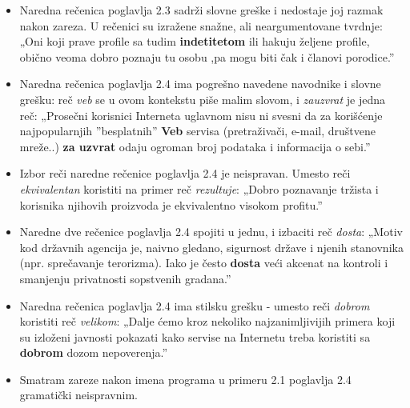 \documentclass[a4paper]{report}
\begin{document}
\begin{itemize}
    \item Naredna rečenica poglavlja 2.3 sadrži slovne greške i nedostaje joj razmak nakon zareza. U rečenici su izražene snažne, ali neargumentovane tvrdnje: \newline
    „Oni koji prave profile sa tudim \textbf{indetitetom} ili hakuju željene profile, obično veoma dobro poznaju tu osobu ,pa mogu biti čak i članovi porodice.”
\end{itemize}
\begin{itemize}
    \item Naredna rečenica poglavlja 2.4 ima pogrešno navedene navodnike i slovne grešku: reč  \textit{veb} se u ovom kontekstu piše malim slovom, i \textit{zauzvrat} je jedna reč: \newline
    „Prosečni korisnici Interneta uglavnom nisu ni svesni da za korišćenje najpopularnjih ”besplatnih” \textbf{Veb} servisa (pretraživači, e-mail, društvene mreže..) \textbf{za uzvrat} odaju ogroman broj podataka i informacija o sebi.”
\end{itemize}
\begin{itemize}
    \item Izbor reči naredne rečenice poglavlja 2.4 je neispravan. Umesto reči  \textit{ekvivalentan} koristiti na primer reč \textit{rezultuje}:\newline
    „Dobro poznavanje tržista i korisnika njihovih proizvoda je ekvivalentno visokom profitu.”
\end{itemize}
\begin{itemize}
    \item Naredne dve rečenice poglavlja 2.4 spojiti u jednu, i izbaciti reč  \textit{dosta}: \newline
    „Motiv kod državnih agencija je, naivno gledano, sigurnost države i njenih stanovnika (npr. sprečavanje terorizma). Iako je često  \textbf{dosta} veći akcenat na kontroli i smanjenju privatnosti sopstvenih gradana.”
\end{itemize}
\begin{itemize}
    \item Naredna rečenica poglavlja 2.4 ima stilsku grešku - umesto reči \textit{dobrom} koristiti reč \textit{velikom}: \newline
    „Dalje ćemo kroz nekoliko najzanimljivijih primera koji su izloženi javnosti pokazati kako servise na Internetu treba koristiti sa \textbf{dobrom} dozom nepoverenja.”
\end{itemize}
\begin{itemize}
    \item Smatram zareze nakon imena programa u primeru 2.1 poglavlja 2.4 gramatički neispravnim. 
\end{itemize}
\end{document}
